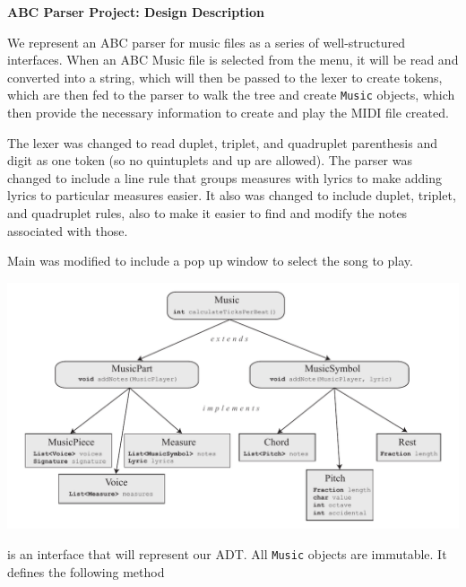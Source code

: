 \documentclass[12pt]{book}
\begin{document}
\phantom{xxx}
\bigskip
\centerline{{\large \bf ABC Parser Project: Design Description }}
\bigskip\bigskip


We represent an ABC parser for music files as a series of well-structured interfaces. When an ABC Music file is selected from the menu, it will be read and converted into a string, which will then be passed to the lexer to create tokens, which are then fed to the parser to walk the tree and create {\tt Music} objects, which then provide the necessary information to create and play the MIDI file created.


The lexer was changed to read duplet, triplet, and quadruplet parenthesis and digit as one token (so no quintuplets and up are allowed). The parser was changed to include a line rule that groups measures with lyrics to make adding lyrics to particular measures easier. It also was changed to include duplet, triplet, and quadruplet rules, also to make it easier to find and modify the notes associated with those.

Main was modified to include a pop up window to select the song to play.

\bigskip
{}

\centerline{ \includegraphics{Music.pdf}}

 is an interface that will represent our ADT. All {\tt Music} objects are immutable. It defines the following method
\end{document}

